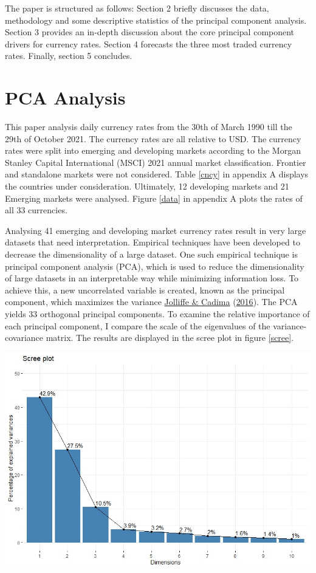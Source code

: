 \documentclass[11pt,preprint, authoryear]{elsarticle}
\let\origfigure\figure
\let\endorigfigure\endfigure
\renewenvironment{figure}[1][2] {
    \expandafter\origfigure\expandafter[H]
} {
    \endorigfigure
}
\numberwithin{equation}{section}
\numberwithin{figure}{section}
\numberwithin{table}{section}
\begin{document}
The paper is structured as follows: Section 2 briefly discusses the
data, methodology and some descriptive statistics of the principal
component analysis. Section 3 provides an in-depth discussion about the
core principal component drivers for currency rates. Section 4 forecasts
the three most traded currency rates. Finally, section 5 concludes.

\hypertarget{pca-analysis}{%
\section{PCA Analysis}\label{pca-analysis}}

This paper analysis daily currency rates from the 30th of March 1990
till the 29th of October 2021. The currency rates are all relative to
USD. The currency rates were split into emerging and developing markets
according to the Morgan Stanley Capital International (MSCI) 2021 annual
market classification. Frontier and standalone markets were not
considered. Table \ref{cncy} in appendix A displays the countries under
consideration. Ultimately, 12 developing markets and 21 Emerging markets
were analysed. Figure \ref{data} in appendix A plots the rates of all 33
currencies.

Analysing 41 emerging and developing market currency rates result in
very large datasets that need interpretation. Empirical techniques have
been developed to decrease the dimensionality of a large dataset. One
such empirical technique is principal component analysis (PCA), which is
used to reduce the dimensionality of large datasets in an interpretable
way while minimizing information loss. To achieve this, a new
uncorrelated variable is created, known as the principal component,
which maximizes the variance \protect\hyperlink{ref-jolli}{Jolliffe \&
Cadima} (\protect\hyperlink{ref-jolli}{2016}). The PCA yields 33
orthogonal principal components. To examine the relative importance of
each principal component, I compare the scale of the eigenvalues of the
variance-covariance matrix. The results are displayed in the scree plot
in figure \ref{scree}.

\begin{figure}[h]
\centering
\includegraphics[scale=0.7]{scree.jpg}
\caption{Scree plot}
\label{scree}
\end{figure}
\end{document}
